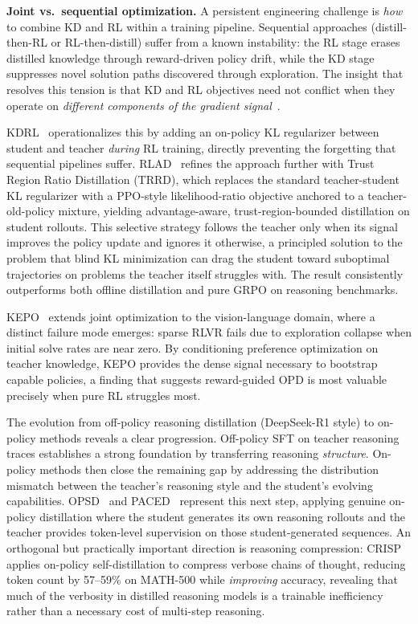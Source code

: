 \documentclass{article} %
\begin{document}
\textbf{Joint vs.\ sequential optimization.}
A persistent engineering challenge is \emph{how} to combine KD and RL within a training pipeline. Sequential approaches (distill-then-RL or RL-then-distill) suffer from a known instability: the RL stage erases distilled knowledge through reward-driven policy drift, while the KD stage suppresses novel solution paths discovered through exploration. The insight that resolves this tension is that KD and RL objectives need not conflict when they operate on \emph{different components of the gradient signal}~\citep{2512.23097}.

KDRL~\citep{2506.02208} operationalizes this by adding an on-policy KL regularizer between student and teacher \emph{during} RL training, directly preventing the forgetting that sequential pipelines suffer. RLAD~\citep{2602.22495} refines the approach further with Trust Region Ratio Distillation (TRRD), which replaces the standard teacher-student KL regularizer with a PPO-style likelihood-ratio objective anchored to a teacher-old-policy mixture, yielding advantage-aware, trust-region-bounded distillation on student rollouts. This selective strategy follows the teacher only when its signal improves the policy update and ignores it otherwise, a principled solution to the problem that blind KL minimization can drag the student toward suboptimal trajectories on problems the teacher itself struggles with. The result consistently outperforms both offline distillation and pure GRPO on reasoning benchmarks.

KEPO~\citep{2602.00400} extends joint optimization to the vision-language domain, where a distinct failure mode emerges: sparse RLVR fails due to exploration collapse when initial solve rates are near zero. By conditioning preference optimization on teacher knowledge, KEPO provides the dense signal necessary to bootstrap capable policies, a finding that suggests reward-guided OPD is most valuable precisely when pure RL struggles most.

The evolution from off-policy reasoning distillation (DeepSeek-R1 style) to on-policy methods reveals a clear progression. Off-policy SFT on teacher reasoning traces establishes a strong foundation by transferring reasoning \emph{structure}. On-policy methods then close the remaining gap by addressing the distribution mismatch between the teacher's reasoning style and the student's evolving capabilities. OPSD~\citep{2601.18734} and PACED~\citep{2603.11178} represent this next step, applying genuine on-policy distillation where the student generates its own reasoning rollouts and the teacher provides token-level supervision on those student-generated sequences. An orthogonal but practically important direction is reasoning compression: CRISP~\citep{2603.05433} applies on-policy self-distillation to compress verbose chains of thought, reducing token count by 57--59\% on MATH-500 while \emph{improving} accuracy, revealing that much of the verbosity in distilled reasoning models is a trainable inefficiency rather than a necessary cost of multi-step reasoning.
\end{document}
